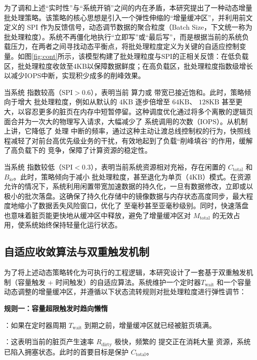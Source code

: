 为了调和上述“实时性”与“系统开销”之间的内在矛盾，本研究提出了一种动态增量批处理策略。该策略的核心思想是引入一个弹性伸缩的“增量缓冲区”，并利用前文定义的 SPI 作为反馈信号，动态调节数据的聚合粒度（Batch Size，下文统一称为批处理粒度）。系统不再僵化地执行“立即写”或“最后写”，而是根据当前的系统负载压力，在两者之间寻找动态平衡点，将批处理粒度定义为关键的自适应控制变量。如图\ref{fig:cont}所示，该模型构建了批处理粒度与SPI的正相关反馈：在低负载区，批处理粒度收敛至4KB以保障数据鲜度；在高负载区，批处理粒度指数级增长以减少IOPS中断，实现积少成多的削峰效果。

当系统  指数较高（$\text{SPI} > 0.6$），表明当前  算力或  带宽已接近饱和。此时，策略倾向于增大 批处理粒度，例如从默认的 $4\text{KB}$ 逐步倍增至 $64\text{KB}$、 $128\text{KB}$ 甚至更大，以容忍更多的脏页在内存中短暂停留。这种调度优化通过将多个离散的逻辑页面合并为一次大的物理写入请求，大幅减少了  系统调用的次数（IOPS）。从机制上讲，它降低了  处理  中断的频率，通过这种主动让渡总线控制权的行为，快照线程减轻了对前台高优先级业务的干扰，有效地起到了负载“削峰填谷”的作用，缓解了高负载下的  竞争，保障了计算资源的稳定性。

当系统  指数较低（$\text{SPI} < 0.3$），表明当前系统资源相对充裕，存在闲置的 $C_{\text{total}}$ 和 $B_{\text{io}}$。此时，策略倾向于减小 批处理粒度，甚至退化为单页（$4\text{KB}$）模式。在资源允许的情况下，系统利用闲置带宽加速数据的持久化，一旦有数据修改，立即或以极小的批次落盘。这确保了持久化存储中的镜像数据与内存状态高度同步，最大程度地缩小了数据丢失风险窗口，优化了  至毫秒甚至亚毫秒级别。同时，快速落盘也意味着脏页能更快地从缓冲区中释放，避免了增量缓冲区对 $M_{\text{total}}$ 的无效占用，使系统始终保持轻量化运行状态。

\subsection{自适应收敛算法与双重触发机制}

为了将上述动态策略转化为可执行的工程逻辑，本研究设计了一套基于双重触发机制（容量触发 + 时间触发）的自适应算法。系统维护一个定时器$T_{\text{wait}}$ 和一个容量动态调整的增量缓冲区，并遵循以下状态流转规则对批处理粒度进行弹性调节：

\textbf{规则一：容量超限触发时趋向懒惰}

：如果在定时器周期 $T_{\text{wait}}$ 到期之前，增量缓冲区就已经被脏页填满。

：这表明当前的脏页产生速率 $R_{\text{dirty}}$ 极快，频繁的  提交正在消耗大量  资源，系统已陷入拥塞状态。此时的首要目标是保护 $C_{\text{total}}$。

